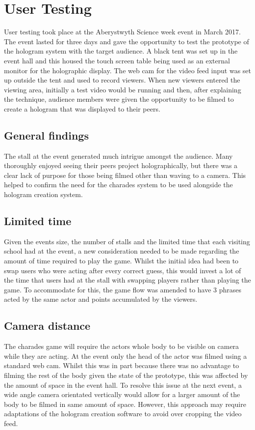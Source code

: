 \section{User Testing}
User testing took place at the Aberystwyth Science week event in March 2017. The event lasted for three days and gave the opportunity to test the prototype of the hologram system with the target audience. A black tent was set up in the event hall and this housed the touch screen table being used as an external monitor for the holographic display. The web cam for the video feed input was set up outside the tent and used to record viewers. When new viewers entered the viewing area, initially a test video would be running and then, after explaining the technique, audience members were given the opportunity to be filmed to create a hologram that was displayed to their peers.

\subsection{General findings}
The stall at the event generated much intrigue amongst the audience. Many thoroughly enjoyed seeing their peers project holographically, but there was a clear lack of purpose for those being filmed other than waving to a camera. This helped to confirm the need for the charades system to be used alongside the hologram creation system.

\subsection{Limited time}
Given the events size, the number of stalls and the limited time that each visiting school had at the event, a new consideration needed to be made regarding the amount of time required to play the game. Whilst the initial idea had been to swap users who were acting after every correct guess, this would invest a lot of the time that users had at the stall with swapping players rather than playing the game. To accommodate for this, the game flow was amended to have 3 phrases acted by the same actor and points accumulated by the viewers.

\subsection{Camera distance}
The charades game will require the actors whole body to be visible on camera while they are acting. At the event only the head of the actor was filmed using a standard web cam. Whilst this was in part because there was no advantage to filming the rest of the body given the state of the prototype, this was affected by the amount of space in the event hall. To resolve this issue at the next event, a wide angle camera orientated vertically would allow for a larger amount of the body to be filmed in same amount of space. However, this approach may require adaptations of the hologram creation software to avoid over cropping the video feed.